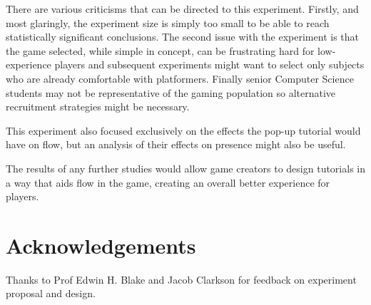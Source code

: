 \documentclass{acmsiggraph}
\begin{document}
There are various criticisms that can be directed to this experiment. Firstly, and most glaringly, the experiment size is simply too small to be able to reach statistically significant conclusions. The second issue with the experiment is that the game selected, while simple in concept, can be frustrating hard for low-experience players and subsequent experiments might want to select only subjects who are already comfortable with platformers. Finally senior Computer Science students may not be representative of the gaming population so alternative recruitment strategies might be necessary.

This experiment also focused exclusively on the effects the pop-up tutorial would have on flow, but an analysis of their effects on presence might also be useful.

The results of any further studies would allow game creators to design tutorials in a way that aids flow in the game, creating an overall better experience for players.

\section*{Acknowledgements}

Thanks to Prof Edwin H. Blake and Jacob Clarkson for feedback on experiment proposal and design.


\nocite{*}

\end{document}
